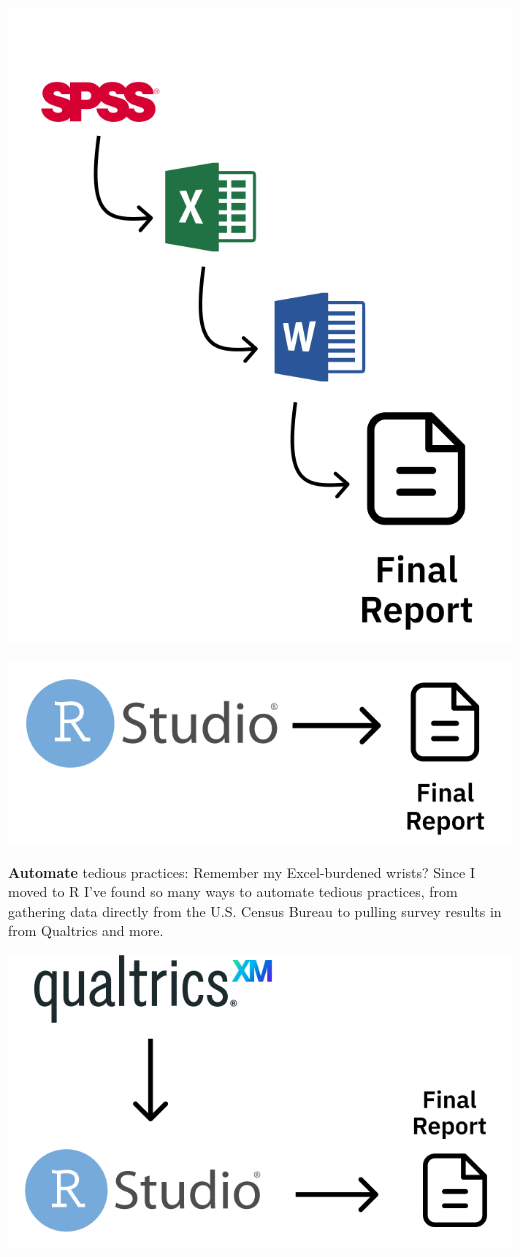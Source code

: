 \documentclass[
]{book}
\begin{document}
\includegraphics{assets/non-r-workflow.png}

\includegraphics{assets/r-workflow.png}

\textbf{Automate} tedious practices: Remember my Excel-burdened wrists? Since I moved to R I've found so many ways to automate tedious practices, from gathering data directly from the U.S. Census Bureau to pulling survey results in from Qualtrics and more.

\includegraphics{assets/qualtrics-workflow.png}
\end{document}

